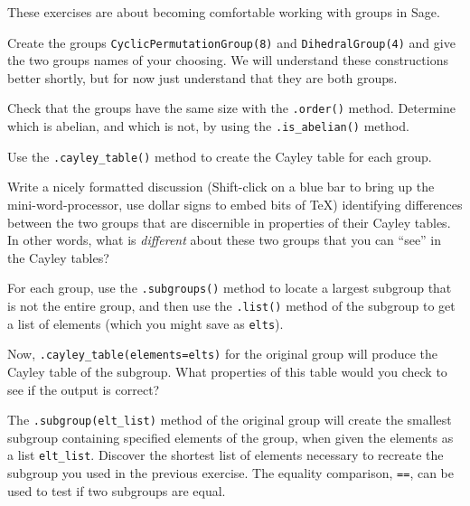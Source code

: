 These exercises are about becoming comfortable working with groups in Sage.
\begin{sageverbatim}\end{sageverbatim}
%
%
Create the groups \verb?CyclicPermutationGroup(8)? and \verb?DihedralGroup(4)? and give the two groups names of your choosing.  We will understand these constructions better shortly, but for now just understand that they are both groups.
\begin{sageverbatim}\end{sageverbatim}
%
%
Check that the groups have the same size with the \verb?.order()? method.  Determine which is abelian, and which is not, by using the \verb?.is_abelian()? method.
\begin{sageverbatim}\end{sageverbatim}
%
%
Use the \verb?.cayley_table()? method to create the Cayley table for each group.
\begin{sageverbatim}\end{sageverbatim}
%
%
Write a nicely formatted discussion (Shift-click on a blue bar to bring up the mini-word-processor, use dollar signs to embed bits of \TeX) identifying differences between the two groups that are discernible in properties of their Cayley tables.  In other words, what is {\em different} about these two groups that you can ``see'' in the Cayley tables?
\begin{sageverbatim}\end{sageverbatim}
%
%
For each group, use the \verb?.subgroups()? method to locate a largest subgroup that is not the entire group, and then use the \verb?.list()? method of the subgroup to get a list of elements (which you might save as \verb?elts?).\par
%
Now, \verb?.cayley_table(elements=elts)? for the original group will produce the Cayley table of the subgroup.  What properties of this table would you check to see if the output is correct?
\begin{sageverbatim}\end{sageverbatim}
%
%
The \verb?.subgroup(elt_list)? method of the original group will create the smallest subgroup containing specified elements of the group, when given the elements as a list \verb?elt_list?.  Discover the shortest list of elements necessary to recreate the subgroup you used in the previous exercise.  The equality comparison, \verb?==?, can be used to test if two subgroups are equal.
\begin{sageverbatim}\end{sageverbatim}
%
